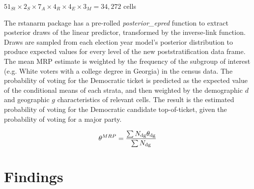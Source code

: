 \begin{center}
$ 51_{St} \times 2_{S} \times 7_{A} \times 4_{R} \times 4_{E} \times 3_{M} =  34,272$ cells\\
\end{center}

The rstanarm package has a pre-rolled \textit{posterior\_epred} function to extract posterior draws of the linear predictor, transformed by the inverse-link function. Draws are sampled from each election year model's posterior distribution to produce expected values for every level of the new poststratification data frame. The mean MRP estimate is weighted by the frequency of the subgroup of interest (e.g. White voters with a college degree in Georgia) in the census data. The probability of voting for the Democratic ticket is predicted as the expected value of the conditional means of each strata, and then weighted by the demographic $d$ and geographic $g$ characteristics of relevant cells. The result is the estimated probability of voting for the Democratic candidate top-of-ticket, given the probability of voting for a major party. 

\begin{align*}
\label{mrp_ps}
\theta^{MRP} = \frac{\sum N_{\rm dg} \theta_{\rm dg}}{\sum N_{\rm dg}}
\end{align*}


\section{Findings}

